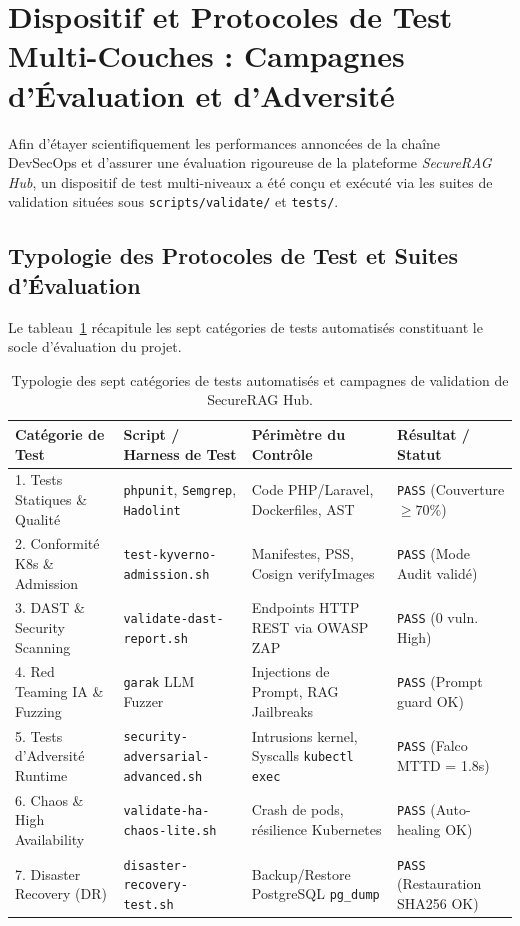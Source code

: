 \section{Dispositif et Protocoles de Test Multi-Couches : Campagnes d'Évaluation et d'Adversité}
\label{sec:dispositif_tests_evaluation}

Afin d'étayer scientifiquement les performances annoncées de la chaîne DevSecOps et d'assurer une évaluation rigoureuse de la plateforme \textit{SecureRAG Hub}, un dispositif de test multi-niveaux a été conçu et exécuté via les suites de validation situées sous \texttt{scripts/validate/} et \texttt{tests/}.

\subsection{Typologie des Protocoles de Test et Suites d'Évaluation}

Le tableau~\ref{tab:typologie_tests} récapitule les sept catégories de tests automatisés constituant le socle d'évaluation du projet.

\begin{table}[htbp]
\centering
\scriptsize
\begin{tabular}{@{}p{3.2cm}p{3.8cm}p{3.6cm}p{3.2cm}@{}}
\toprule
\textbf{Catégorie de Test} & \textbf{Script / Harness de Test} & \textbf{Périmètre du Contrôle} & \textbf{Résultat / Statut} \\
\midrule
1. Tests Statiques \& Qualité & \texttt{phpunit}, \texttt{Semgrep}, \texttt{Hadolint} & Code PHP/Laravel, Dockerfiles, AST & \texttt{PASS} (Couverture $\ge 70\%$) \\
2. Conformité K8s \& Admission & \texttt{test-kyverno-admission.sh} & Manifestes, PSS, Cosign verifyImages & \texttt{PASS} (Mode Audit validé) \\
3. DAST \& Security Scanning & \texttt{validate-dast-report.sh} & Endpoints HTTP REST via OWASP ZAP & \texttt{PASS} (0 vuln. High) \\
4. Red Teaming IA \& Fuzzing & \texttt{garak} LLM Fuzzer & Injections de Prompt, RAG Jailbreaks & \texttt{PASS} (Prompt guard OK) \\
5. Tests d'Adversité Runtime & \texttt{security-adversarial-advanced.sh} & Intrusions kernel, Syscalls \texttt{kubectl exec} & \texttt{PASS} (Falco MTTD = 1.8s) \\
6. Chaos \& High Availability & \texttt{validate-ha-chaos-lite.sh} & Crash de pods, résilience Kubernetes & \texttt{PASS} (Auto-healing OK) \\
7. Disaster Recovery (DR) & \texttt{disaster-recovery-test.sh} & Backup/Restore PostgreSQL \texttt{pg\_dump} & \texttt{PASS} (Restauration SHA256 OK) \\
\bottomrule
\end{tabular}
\caption{Typologie des sept catégories de tests automatisés et campagnes de validation de SecureRAG Hub.}
\label{tab:typologie_tests}
\end{table}

